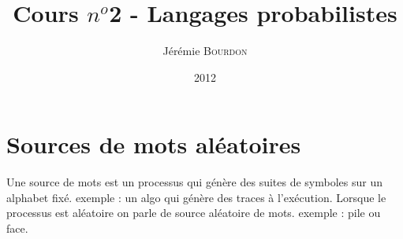 \documentclass[a4paper,11pt]{article}
\begin{document}
\title{Cours $n^o$2 - Langages probabilistes}
\author{Jérémie \textsc{Bourdon}}
\date{2012}
\maketitle
\section{Sources de mots aléatoires}
 \p Une source de mots est un processus qui génère des suites de symboles sur un
 alphabet fixé.
 \p exemple : un algo qui génère des traces à l'exécution.
 \p Lorsque le processus est aléatoire on parle de source aléatoire de mots.
 \p exemple : pile ou face.
\end{document}
